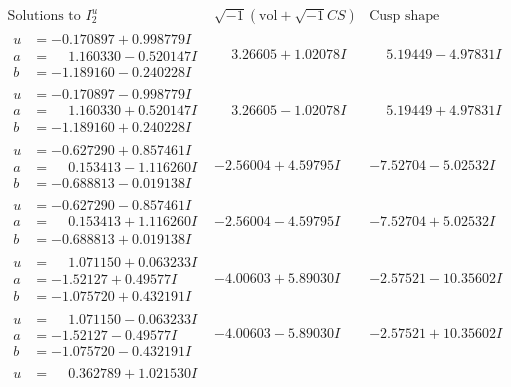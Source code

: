\documentclass[1p]{elsarticle_modified}
\theoremstyle{definition}
\newcommand{\I}{\sqrt{-1}}
\begin{document}
$$\begin{array}{c|c|c}  
\text{Solutions to }I^u_{2}& \I (\text{vol} + \sqrt{-1}CS) & \text{Cusp shape}\\
 \hline 
\begin{aligned}
u &= -0.170897 + 0.998779 I \\
a &= \phantom{-}1.160330 - 0.520147 I \\
b &= -1.189160 - 0.240228 I\end{aligned}
 & \phantom{-}3.26605 + 1.02078 I & \phantom{-}5.19449 - 4.97831 I \\ \hline\begin{aligned}
u &= -0.170897 - 0.998779 I \\
a &= \phantom{-}1.160330 + 0.520147 I \\
b &= -1.189160 + 0.240228 I\end{aligned}
 & \phantom{-}3.26605 - 1.02078 I & \phantom{-}5.19449 + 4.97831 I \\ \hline\begin{aligned}
u &= -0.627290 + 0.857461 I \\
a &= \phantom{-}0.153413 - 1.116260 I \\
b &= -0.688813 - 0.019138 I\end{aligned}
 & -2.56004 + 4.59795 I & -7.52704 - 5.02532 I \\ \hline\begin{aligned}
u &= -0.627290 - 0.857461 I \\
a &= \phantom{-}0.153413 + 1.116260 I \\
b &= -0.688813 + 0.019138 I\end{aligned}
 & -2.56004 - 4.59795 I & -7.52704 + 5.02532 I \\ \hline\begin{aligned}
u &= \phantom{-}1.071150 + 0.063233 I \\
a &= -1.52127 + 0.49577 I \\
b &= -1.075720 + 0.432191 I\end{aligned}
 & -4.00603 + 5.89030 I & -2.57521 - 10.35602 I \\ \hline\begin{aligned}
u &= \phantom{-}1.071150 - 0.063233 I \\
a &= -1.52127 - 0.49577 I \\
b &= -1.075720 - 0.432191 I\end{aligned}
 & -4.00603 - 5.89030 I & -2.57521 + 10.35602 I \\ \hline\begin{aligned}
u &= \phantom{-}0.362789 + 1.021530 I \\

\end{aligned}
\end{array}$$
\end{document}
